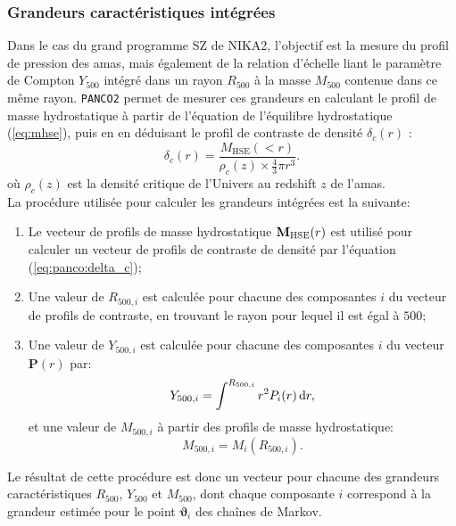 \subsubsection{Grandeurs caractéristiques intégrées} %
\label{sec:panco:integrated_qties}
Dans le cas du grand programme SZ de NIKA2, l'objectif est la mesure du profil de pression des amas, mais également de la relation d'échelle liant le paramètre de Compton $Y_{500}$ intégré dans un rayon $R_{500}$ à la masse $M_{500}$ contenue dans ce même rayon.
\texttt{PANCO2} permet de mesurer ces grandeurs en calculant le profil de masse hydrostatique à partir de l'équation de l'équilibre hydrostatique (\ref{eq:mhse}), puis en en déduisant le profil de contraste de densité $\delta_c(r)$ :
\begin{equation}
    \label{eq:panco:delta_c}
    \delta_c(r) = \frac{M_\mathrm{HSE}(<r)}{\rho_c(z) \times \frac{4}{3} \pi r^3}.
\end{equation}
où $\rho_c(z)$ est la densité critique de l'Univers au redshift $z$ de l'amas. \\
La procédure utilisée pour calculer les grandeurs intégrées est la suivante:
\begin{enumerate}[leftmargin=*]
    \item Le vecteur de profils de masse hydrostatique $\mathbf{M}_{\rm HSE}(r)$ est utilisé pour calculer un vecteur de profils de contraste de densité par l'équation (\ref{eq:panco:delta_c});
    \item Une valeur de $R_{500,i}$ est calculée pour chacune des composantes $i$ du vecteur de profils de contraste, en trouvant le rayon pour lequel il est égal à $500$;
    \item Une valeur de $Y_{500, i}$ est calculée pour chacune des composantes $i$ du vecteur $\mathbf{P}(r)$ par:
    \begin{equation}
        Y_{500, i} = \int^{R_{500, i}} r^2 P_i(r) \, \mathrm{d} r,
    \end{equation}
    et une valeur de $M_{500, i}$ à partir des profils de masse hydrostatique:
    \begin{equation}
        M_{500, i} = M_i(R_{500, i}).
    \end{equation}
\end{enumerate}
Le résultat de cette procédure est donc un vecteur pour chacune des grandeurs caractéristiques $R_{500}$, $Y_{500}$ et $M_{500}$, dont chaque composante $i$ correspond à la grandeur estimée pour le point $\mathbf{\vartheta}_i$ des chaînes de Markov.
